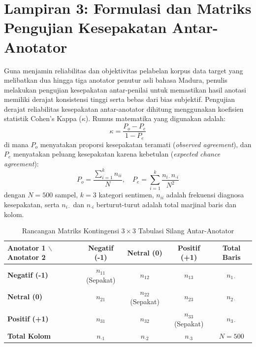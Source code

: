 \section*{Lampiran 3: Formulasi dan Matriks Pengujian Kesepakatan Antar-Anotator}

Guna menjamin reliabilitas dan objektivitas pelabelan korpus data target yang melibatkan dua hingga tiga anotator penutur asli bahasa Madura, penulis melakukan pengujian kesepakatan antar-penilai untuk memastikan hasil anotasi memiliki derajat konsistensi tinggi serta bebas dari bias subjektif. Pengujian derajat reliabilitas kesepakatan antar-anotator dihitung menggunakan koefisien statistik Cohen's Kappa ($\kappa$). Rumus matematika yang digunakan adalah:
\begin{equation}
\label{eq:lampiran_kappa}
\kappa = \frac{P_o - P_e}{1 - P_e}
\end{equation}
di mana $P_o$ menyatakan proporsi kesepakatan teramati (\textit{observed agreement}), dan $P_e$ menyatakan peluang kesepakatan karena kebetulan (\textit{expected chance agreement}):
\begin{equation}
\label{eq:lampiran_pe}
P_o = \frac{\sum_{i=1}^{k} n_{ii}}{N}, \quad P_e = \sum_{i=1}^{k} \frac{n_{i\cdot} n_{\cdot i}}{N^2}
\end{equation}
dengan $N = 500$ sampel, $k = 3$ kategori sentimen, $n_{ii}$ adalah frekuensi diagnosa kesepakatan, serta $n_{i\cdot}$ dan $n_{\cdot i}$ berturut-turut adalah total marjinal baris dan kolom.

\begin{table}[H]
\centering
\footnotesize
\renewcommand{\arraystretch}{1.25}
\begin{tabular}{|l|c|c|c|c|}
\hline
\rowcolor{gray!20}
\textbf{Anotator 1 $\backslash$ Anotator 2} & \textbf{Negatif (-1)} & \textbf{Netral (0)} & \textbf{Positif (+1)} & \textbf{Total Baris} \\
\hline
\textbf{Negatif (-1)} & $n_{11}$ (Sepakat) & $n_{12}$ & $n_{13}$ & $n_{1\cdot}$ \\
\hline
\textbf{Netral (0)} & $n_{21}$ & $n_{22}$ (Sepakat) & $n_{23}$ & $n_{2\cdot}$ \\
\hline
\textbf{Positif (+1)} & $n_{31}$ & $n_{32}$ & $n_{33}$ (Sepakat) & $n_{3\cdot}$ \\
\hline
\textbf{Total Kolom} & $n_{\cdot 1}$ & $n_{\cdot 2}$ & $n_{\cdot 3}$ & $N = 500$ \\
\hline
\end{tabular}
\caption{Rancangan Matriks Kontingensi $3 \times 3$ Tabulasi Silang Antar-Anotator}
\label{tab:matriks_kontingensi}
\end{table}

